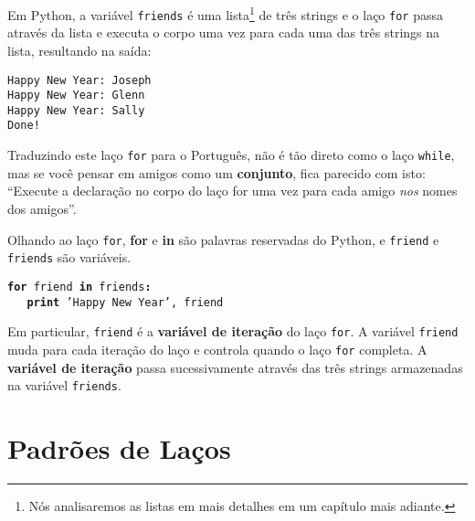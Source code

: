 %
Em Python, a variável {\tt friends} é uma lista\footnote{Nós analisaremos as
	listas em mais detalhes em um capítulo mais adiante.} de três strings e o
laço {\tt for} passa através da lista e executa o corpo uma vez para cada uma
das três strings na lista, resultando na saída:

\beforeverb
\begin{verbatim}
Happy New Year: Joseph
Happy New Year: Glenn
Happy New Year: Sally
Done!
\end{verbatim}
\afterverb
%


Traduzindo este laço {\tt for} para o Português, não é tão direto como o laço
{\tt while}, mas se você pensar em amigos como um {\bf conjunto}, fica
parecido com isto: ``Execute a declaração no corpo do laço for uma vez para
cada amigo \emph{nos} nomes dos amigos''.


Olhando ao laço {\tt for}, {\bf for} e {\bf in} são palavras reservadas do
Python, e {\tt friend} e {\tt friends} são variáveis.

{\tt {\bf for} friend {\bf in} friends{\bf :}\\
	\verb"   "{\bf print} 'Happy New Year', friend }


Em particular, {\tt friend} é a {\bf variável de iteração} do laço {\tt for}.
A variável {\tt friend} muda para cada iteração do laço e controla quando o
laço {\tt for} completa. A {\bf variável de iteração} passa sucessivamente
através das três strings armazenadas na variável {\tt friends}.

\section{Padrões de Laços}

